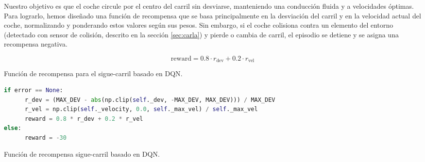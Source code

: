 \newpage

Nuestro objetivo es que el coche circule por el centro del carril sin desviarse, manteniendo una conducción fluida y a velocidades óptimas. Para lograrlo, hemos diseñado una función de recompensa que se basa principalmente en la desviación del carril y en la velocidad actual del coche, normalizando y ponderando estos valores según sus pesos. Sin embargo, si el coche colisiona contra un elemento del entorno (detectado con sensor de colisión, descrito en la sección \ref{sec:carla}) y pierde o cambia de carril, el episodio se detiene y se asigna una recompensa negativa.
  \begin{myequation}[h]
    \begin{equation} 
      \text{reward} = 0.8 \cdot r_{\text{dev}} + 0.2 \cdot r_{\text{vel}} 
    \end{equation} 
    \caption{Función de recompensa para el sigue-carril basado en \ac{DQN}.}
\label{eq:rew_ppo}
  \end{myequation}
\begin{code}[h]
\begin{lstlisting}[language=Python]
if error == None:
      r_dev = (MAX_DEV - abs(np.clip(self._dev, -MAX_DEV, MAX_DEV))) / MAX_DEV
      r_vel = np.clip(self._velocity, 0.0, self._max_vel) / self._max_vel
      reward = 0.8 * r_dev + 0.2 * r_vel
else:
      reward = -30
\end{lstlisting}
\caption[Función de recompensa sigue-carril basado en \ac{DQN}]{Función de recompensa sigue-carril basado en \ac{DQN}.}
\label{cod:rew_dqn}
\end{code}

\newpage

